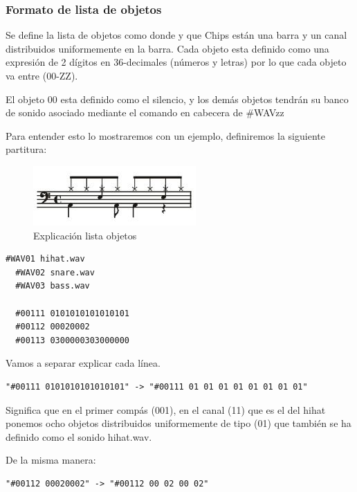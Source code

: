 \documentclass[a4paper,11pt,oneside]{book}
\begin{document}
\subsubsection{Formato de lista de objetos}
Se define la lista de objetos como donde y que \gls{Chips} están una barra y un canal distribuidos uniformemente en la barra.
Cada objeto esta definido como una expresión de 2 dígitos en 36-decimales (números y letras) por lo que cada objeto va entre (00-ZZ).

El objeto 00 esta definido como el silencio, y los demás objetos tendrán su banco de sonido asociado mediante el comando en cabecera de \#WAVzz

Para entender esto lo mostraremos con un ejemplo, definiremos la siguiente partitura:


\begin{figure}[H]
\begin{center}
\includegraphics[scale=5.0]{Imagenes/explicacion-lista-objetos.jpg}
\caption{Explicación lista objetos}
\label{Explicación lista objetos}
\end{center}
\end{figure}


\begin{Verbatim}[frame=single]
  #WAV01 hihat.wav
  #WAV02 snare.wav
  #WAV03 bass.wav

  #00111 0101010101010101
  #00112 00020002
  #00113 0300000303000000
\end{Verbatim}

Vamos a separar explicar cada línea.

\begin{Verbatim}[frame=single]
"#00111 0101010101010101" -> "#00111 01 01 01 01 01 01 01 01"
\end{Verbatim}

Significa que en el primer compás (001), en el canal (11) que es el del hihat ponemos ocho objetos distribuidos uniformemente de tipo (01) que también se ha definido como el sonido hihat.wav. 

De la misma manera:

\begin{Verbatim}[frame=single]
"#00112 00020002" -> "#00112 00 02 00 02"
\end{Verbatim}
\end{document}
